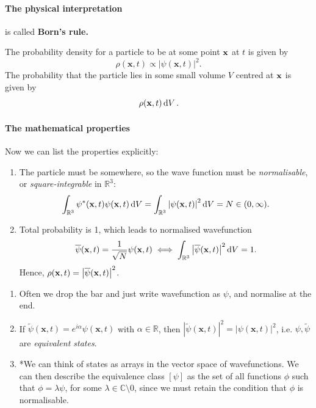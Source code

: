 \documentclass[a4paper,11pt]{article}
\begin{document}
\paragraph{The physical interpretation} is called \textbf{Born's rule.}

\begin{proposition}
    The probability density for a particle to be at some point \( \vb x \) at \( t \) is given by 
    \[
        \rho(\mathbf{x},t) \propto \left| \psi(\mathbf{x},t) \right| ^2. 
    \]
    The probability that the particle lies in some small volume \( V \) centred at \( \vb x \) is given by 
    \[
        \rho(\vb x, t) \dd{V}.
    \]
\end{proposition}

\paragraph{The mathematical properties} Now we can list the properties explicitly:
\begin{enumerate}
    \item The particle must be somewhere, so the wave function must be \textit{normalisable}, or \textit{square-integrable} in \( \mathbb R^3 \):
    \[
        \int_{\mathbb R^3} \psi^*(\vb x, t) \psi(\vb x, t) \dd{V} = \int_{\mathbb R^3} \abs{\psi(\vb x, t)}^2 \dd{V} = N \in (0, \infty).
    \]
    \item Total probability is 1, which leads to normalised wavefunction
    \[
        \overline{\psi}(\vb x, t) = \frac{1}{\sqrt{N}} \psi(\vb x, t) \iff \int_{\mathbb R^3} \abs{\overline{\psi}(\vb x, t)}^2 \dd{V} = 1.
    \]
    Hence, \( \rho(\vb x,t) = \abs{\overline{\psi}(\vb x,t)}^2 \).
\end{enumerate}

\begin{note}
    \begin{enumerate}
        \item Often we drop the bar and just write wavefunction as $ \psi $, and normalise at the end. 
        \item If $ \widetilde{\psi}(\mathbf{x},t) = e^{i\alpha} \psi(\mathbf{x},t) $ with $ \alpha\in \mathbb{R} $, then $ \left| \widetilde{\psi}(\mathbf{x},t) \right|^2 = \left| \psi(\mathbf{x},t) \right| ^2  $, i.e. $ \psi,\widetilde{\psi} $ are \textit{equivalent states}. 
        \item *We can think of states as arrays in the vector space of wavefunctions.
        We can then describe the equivalence class \( [\psi] \) as the set of all functions \( \phi \) such that \( \phi = \lambda \psi \), for some \( \lambda \in \mathbb C \setminus \qty{0} \), since we must retain the condition that \( \phi \) is normalisable.
    \end{enumerate}
\end{note}
\end{document}
